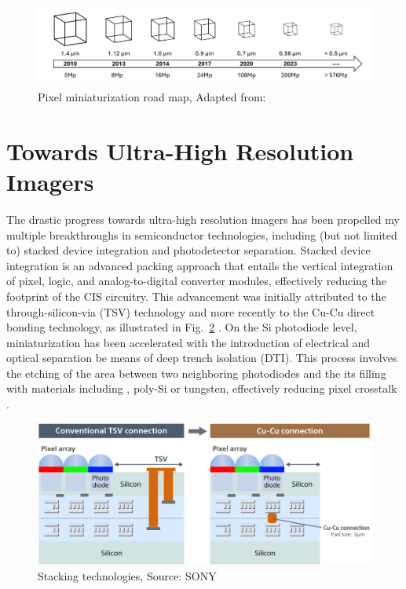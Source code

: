 \begin{figure}
  \centering
  \medskip
  \includegraphics[width=.99\textwidth]{chapters/introduction/image/pixel_miniaturization.pdf}
  \caption[Short caption for Table of Figures]{Pixel miniaturization road map, Adapted from: \cite{SookyoungRoh2025Dispersion-engineeredSensors}}
  \label{fig:ch1:pixel_size}
\end{figure}

\section{Towards Ultra-High Resolution Imagers}

The drastic progress towards ultra-high resolution imagers has been propelled my multiple breakthroughs in semiconductor technologies, including (but not limited to) stacked device integration and photodetector separation. Stacked device integration is an advanced packing approach that entails the vertical integration of pixel, logic, and analog-to-digital converter modules, effectively reducing the footprint of the CIS circuitry. This advancement was initially attributed to the through-silicon-via (TSV) technology and more recently to the Cu-Cu direct bonding technology, as illustrated in Fig.~\ref{fig:ch1:stacking_technologies} \cite{Kagawa20193DSensors}. On the Si photodiode level, miniaturization has been accelerated with the introduction of electrical and optical separation be means of deep trench isolation (DTI). This process involves the etching of the area between two neighboring photodiodes and the its filling with materials including , poly-Si or tungsten, effectively reducing pixel crosstalk \cite{Ahn2014AGate, Okawa2019ALevel, Kim2020ATechnology, Park20217.9Isolation}.   

\begin{figure}
  \centering
  \medskip
  \includegraphics[width=.8\textwidth]{chapters/introduction/image/stacking.jpg}
  \caption[Short caption for Table of Figures]{Stacking technologies, Source: SONY}
  \label{fig:ch1:stacking_technologies} 
\end{figure}



